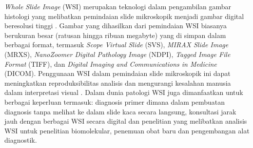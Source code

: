 \noindent \textit{Whole Slide Image} (WSI) merupakan teknologi dalam pengambilan gambar histologi yang melibatkan pemindaian slide mikroskopik menjadi gambar digital beresolusi tinggi \cite{hanna_whole_2020}. Gambar yang dihasilkan dari pemindaian WSI biasanya berukuran besar (ratusan hingga ribuan megabyte) yang di simpan dalam berbagai format, termasuk \textit{Scope Virtual Slide} (SVS), \textit{MIRAX Slide Image} (MRXS), \textit{NanoZoomer Digital Pathology Image} (NDPI), \textit{Tagged Image File Format} (TIFF), dan \textit{Digital Imaging and Communications in Medicine }(DICOM). Penggunaan WSI dalam pemindaian slide mikroskopik ini dapat meningkatkan reproduksibilitas analisis dan mengurangi kesalahan manusia dalam interpretasi visual \cite{li_hardware-software_2023}. Dalam dunia patologi WSI juga dimanfaatkan untuk berbagai keperluan termasuk: diagnosis primer dimana dalam pembuatan diagnosis tanpa melihat ke dalam slide kaca secara langsung, konsultasi jarak jauh dengan berbagai WSI secara digital dan penelitian yang melibatkan analisis WSI untuk penelitian biomolekular, penemuan obat baru dan pengembangan alat diagnostik.

